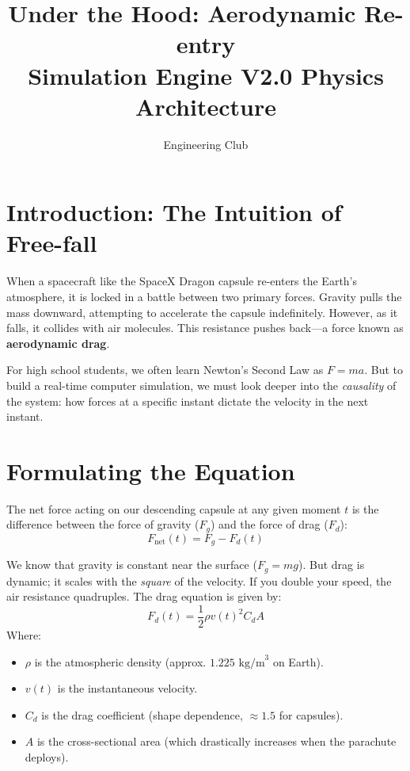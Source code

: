 \documentclass[12pt]{article}
\title{\vspace{-2cm}\textbf{\textcolor{simblue}{Under the Hood: Aerodynamic Re-entry}}\\\large Simulation Engine V2.0 Physics Architecture}
\author{Engineering Club}
\date{}
\begin{document}
\maketitle
\thispagestyle{empty}

\section{Introduction: The Intuition of Free-fall}
When a spacecraft like the SpaceX Dragon capsule re-enters the Earth's atmosphere, it is locked in a battle between two primary forces. Gravity pulls the mass downward, attempting to accelerate the capsule indefinitely. However, as it falls, it collides with air molecules. This resistance pushes back—a force known as \textbf{aerodynamic drag}. 

For high school students, we often learn Newton's Second Law as $F = ma$. But to build a real-time computer simulation, we must look deeper into the \textit{causality} of the system: how forces at a specific instant dictate the velocity in the next instant.

\section{Formulating the Equation}
The net force acting on our descending capsule at any given moment $t$ is the difference between the force of gravity ($F_g$) and the force of drag ($F_d$):
\begin{equation}
    F_{\text{net}}(t) = F_g - F_d(t)
\end{equation}

We know that gravity is constant near the surface ($F_g = mg$). But drag is dynamic; it scales with the \textit{square} of the velocity. If you double your speed, the air resistance quadruples. The drag equation is given by:
\begin{equation}
    F_d(t) = \frac{1}{2} \rho v(t)^2 C_d A
\end{equation}
Where:
\begin{itemize}
    \item $\rho$ is the atmospheric density (approx. $1.225 \text{ kg/m}^3$ on Earth).
    \item $v(t)$ is the instantaneous velocity.
    \item $C_d$ is the drag coefficient (shape dependence, $\approx 1.5$ for capsules).
    \item $A$ is the cross-sectional area (which drastically increases when the parachute deploys).
\end{itemize}
\end{document}
